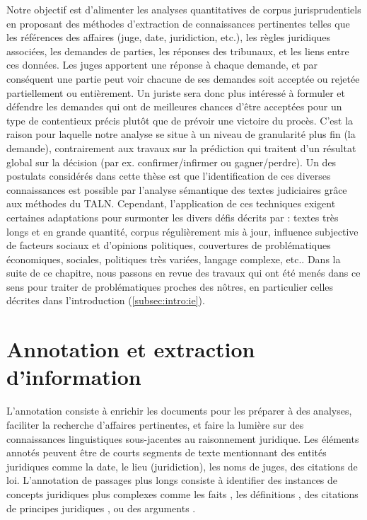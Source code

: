 Notre objectif est d'alimenter les analyses quantitatives de corpus jurisprudentiels en proposant des méthodes d'extraction de connaissances pertinentes telles que les références des affaires (juge, date, juridiction, etc.), les règles juridiques associées, les demandes de parties, les réponses des tribunaux, et les liens entre ces données. Les juges apportent une réponse à chaque demande, et par conséquent une partie peut voir chacune de ses demandes soit acceptée ou rejetée partiellement ou entièrement. Un juriste sera donc plus intéressé à formuler et défendre les demandes qui ont de meilleures chances d'être acceptées pour un type de contentieux précis plutôt que de prévoir une victoire du procès. C'est la raison pour laquelle notre analyse se situe à un niveau de granularité plus fin (la demande), contrairement aux travaux sur la prédiction qui traitent d'un résultat global sur la décision (par ex. confirmer/infirmer ou gagner/perdre).  Un des postulats considérés dans cette thèse est que l'identification de ces diverses connaissances est possible par l'analyse sémantique des textes judiciaires grâce aux méthodes du TALN. Cependant, l'application de ces techniques exigent certaines adaptations pour surmonter les divers défis décrits par \citet{narazenko2017legalnlpintro} : textes très longs et en grande quantité, corpus régulièrement mis à jour, influence subjective de facteurs sociaux et d'opinions politiques, couvertures de problématiques économiques, sociales, politiques très variées, langage complexe, etc.. Dans la suite de ce chapitre, nous passons en revue des travaux qui ont été menés dans ce sens pour traiter de problématiques proches des nôtres, en particulier celles décrites dans l'introduction (\ref{subsec:intro:ie}). 

\section{Annotation et extraction d'information}

L'annotation consiste à enrichir les documents pour les préparer à des analyses, faciliter la recherche d'affaires pertinentes, et faire la lumière sur des connaissances linguistiques sous-jacentes au raisonnement juridique. Les éléments annotés peuvent être de courts segments de texte mentionnant des entités juridiques \citep{Waltl2016lexia, wyner2010extractlegalelts} comme la date, le lieu (juridiction), les noms de juges, des citations de loi.  L'annotation de passages plus longs consiste à identifier des instances de concepts juridiques plus complexes comme les faits \citep{wyner2010extractlegalelts, wyner2010casefactors, Shulayeva2017recognfactprincip}, les définitions \citep{Waltl2016lexia,waltl2017legaliegerman}, des citations de principes juridiques \citep{Shulayeva2017recognfactprincip}, ou des arguments \citep{WynerMoens2010mineargument}. 

